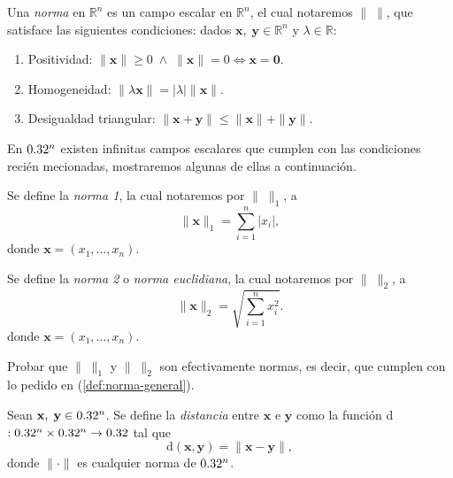 \begin{definition}\label{def:norma-general}
    Una \emph{norma} en $\mathbb{R}^n$ es un campo escalar en $\mathbb{R}^n$, el cual notaremos $\| \; \|$,  que  satisface las siguientes condiciones:  dados $\mathbf{x},\;\mathbf{y} \in \mathbb{R}^n$ y $\lambda \in \mathbb{R}$:
    \begin{enumerate}
        \item Positividad: $\|\mathbf{x}\| \geq 0\;\land\;\|\mathbf{x}\| = 0 \iff \mathbf{x} = \boldsymbol{0}$.
        \item Homogeneidad: $\|\lambda \mathbf{x}\| = |\lambda|\|\mathbf{x}\|$.
        \item Desigualdad triangular: $\|\mathbf{x} + \mathbf{y}\| \leq \|\mathbf{x}\| + \|\mathbf{y}\|$.
    \end{enumerate}
\end{definition}

\begin{obs}
  En $0.32^n$ existen infinitas campos escalares que cumplen con las condiciones reci\'en mecionadas, mostraremos algunas de ellas a continuaci\'on.
\end{obs}

\begin{definition}\label{def:norm1} Se define la \emph{norma 1},  la cual notaremos por $\| \; \|_1$,  a 
    \[
        \|\mathbf{x}\|_1 = \sum_{i=1}^n |x_i|,
    \]
    donde $\mathbf{x}=(x_1,\ldots,x_n)$. 
    \end{definition}

\begin{definition}\label{def:norm2}
   Se define la \emph{norma 2} o \emph{norma euclidiana}, la cual notaremos por  $\|\;\|_2$, a
    \[
        \|\mathbf{x}\|_2 = \sqrt{ \sum_{i=1}^n x_i^2 }.
    \]
    donde $\mathbf{x}=(x_1,\ldots,x_n).$
\end{definition}

\begin{tarea} Probar que  $\| \; \|_1$ y  $\| \; \|_2$ son efectivamente normas, es decir, que cumplen con  lo pedido en (\ref{def:norma-general}). 
\end{tarea}

\begin{definition}
    Sean $\mathbf{x},\;\mathbf{y}\in0.32^n$. Se define la \emph{distancia} entre $\mathbf{x}\text{ e }\mathbf{y}$ como la funci\'on d$:0.32^n\times0.32^n\to0.32$ tal que
    \[
        \text{d}(\mathbf{x},\mathbf{y})=\|\mathbf{x}-\mathbf{y}\|,
    \]
    donde $\|\cdot\|$ es  cualquier norma de $0.32^n$.
\end{definition}

